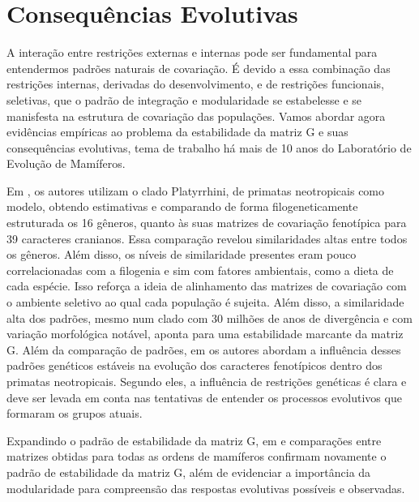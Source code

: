 \section{Consequências Evolutivas}\label{intro:consequencias}

A interação entre restrições externas e internas pode ser fundamental
para entendermos padrões naturais de covariação. 
É devido a essa combinação das restrições internas, derivadas do
desenvolvimento, e de restrições funcionais, seletivas, que o padrão de
integração e modularidade se estabelesse e se manisfesta na estrutura de
covariação das populações.
Vamos abordar agora evidências empíricas ao problema da estabilidade da
matriz G e suas consequências evolutivas, tema de trabalho há mais de 10
anos do Laboratório de Evolução de Mamíferos. 

Em \cite{Marroig2001}, os autores utilizam o clado Platyrrhini, de
primatas neotropicais como modelo, obtendo estimativas e comparando de
forma filogeneticamente estruturada os 16 gêneros, quanto às suas
matrizes de covariação fenotípica para 39 caracteres cranianos. 
Essa comparação revelou similaridades altas entre todos os gêneros. 
Além disso, os níveis de similaridade presentes eram pouco
correlacionadas com a filogenia e sim com fatores ambientais, como a
dieta de cada espécie. 
Isso reforça a ideia de alinhamento das matrizes de covariação com o
ambiente seletivo ao qual cada população é sujeita. 
Além disso, a similaridade alta dos padrões, mesmo num clado com 30
milhões de anos de divergência e com variação morfológica notável,
aponta para uma estabilidade marcante da matriz G. 
Além da comparação de padrões, em \cite{Marroig2005, Marroig2010} os
autores abordam a influência desses padrões genéticos estáveis na
evolução dos caracteres fenotípicos dentro dos primatas neotropicais. 
Segundo eles, a influência de restrições genéticas é clara e deve ser
levada em conta nas tentativas de entender os processos evolutivos que
formaram os grupos atuais. 

Expandindo o padrão de estabilidade da matriz G, em \cite{Porto2009} e
\cite{Marroig2009} comparações entre matrizes obtidas para todas as
ordens de mamíferos confirmam novamente o padrão de estabilidade da matriz
G, além de evidenciar a importância da modularidade para compreensão das
respostas evolutivas possíveis e observadas. 

